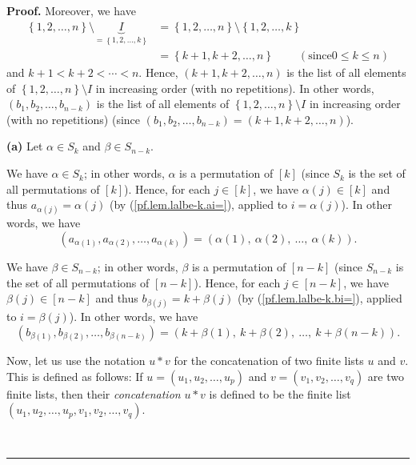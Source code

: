 \documentclass[numbers=enddot,12pt,final,onecolumn,notitlepage,english]{scrartcl}%
\theoremstyle{definition}
\newenvironment{proof}[1][Proof]{\noindent\textbf{#1.} }{\ \rule{0.5em}{0.5em}}
\newenvironment{verlong}{}{}
\begin{document}
\begin{verlong}
\begin{proof}
Moreover, we have%
\begin{align*}
\left\{  1,2,\ldots,n\right\}  \setminus\underbrace{I}_{=\left\{
1,2,\ldots,k\right\}  }  &  =\left\{  1,2,\ldots,n\right\}  \setminus\left\{
1,2,\ldots,k\right\} \\
&  =\left\{  k+1,k+2,\ldots,n\right\}  \ \ \ \ \ \ \ \ \ \ \left(  \text{since
}0\leq k\leq n\right)
\end{align*}
and $k+1<k+2<\cdots<n$. Hence, $\left(  k+1,k+2,\ldots,n\right)  $ is the list
of all elements of $\left\{  1,2,\ldots,n\right\}  \setminus I$ in increasing
order (with no repetitions). In other words, $\left(  b_{1},b_{2}%
,\ldots,b_{n-k}\right)  $ is the list of all elements of $\left\{
1,2,\ldots,n\right\}  \setminus I$ in increasing order (with no repetitions)
(since $\left(  b_{1},b_{2},\ldots,b_{n-k}\right)  =\left(  k+1,k+2,\ldots
,n\right)  $). \medskip

\textbf{(a)} Let $\alpha\in S_{k}$ and $\beta\in S_{n-k}$.

We have $\alpha\in S_{k}$; in other words, $\alpha$ is a permutation of
$\left[  k\right]  $ (since $S_{k}$ is the set of all permutations of $\left[
k\right]  $). Hence, for each $j\in\left[  k\right]  $, we have $\alpha\left(
j\right)  \in\left[  k\right]  $ and thus $a_{\alpha\left(  j\right)  }%
=\alpha\left(  j\right)  $ (by (\ref{pf.lem.lalbe-k.ai=}), applied to
$i=\alpha\left(  j\right)  $). In other words, we have%
\[
\left(  a_{\alpha\left(  1\right)  },a_{\alpha\left(  2\right)  }%
,\ldots,a_{\alpha\left(  k\right)  }\right)  =\left(  \alpha\left(  1\right)
,\ \alpha\left(  2\right)  ,\ \ldots,\ \alpha\left(  k\right)  \right)  .
\]


We have $\beta\in S_{n-k}$; in other words, $\beta$ is a permutation of
$\left[  n-k\right]  $ (since $S_{n-k}$ is the set of all permutations of
$\left[  n-k\right]  $). Hence, for each $j\in\left[  n-k\right]  $, we have
$\beta\left(  j\right)  \in\left[  n-k\right]  $ and thus $b_{\beta\left(
j\right)  }=k+\beta\left(  j\right)  $ (by (\ref{pf.lem.lalbe-k.bi=}), applied
to $i=\beta\left(  j\right)  $). In other words, we have%
\[
\left(  b_{\beta\left(  1\right)  },b_{\beta\left(  2\right)  },\ldots
,b_{\beta\left(  n-k\right)  }\right)  =\left(  k+\beta\left(  1\right)
,\ k+\beta\left(  2\right)  ,\ \ldots,\ k+\beta\left(  n-k\right)  \right)  .
\]


Now, let us use the notation $u\ast v$ for the concatenation of two finite
lists $u$ and $v$. This is defined as follows: If $u=\left(  u_{1}%
,u_{2},\ldots,u_{p}\right)  $ and $v=\left(  v_{1},v_{2},\ldots,v_{q}\right)
$ are two finite lists, then their \emph{concatenation} $u\ast v$ is defined
to be the finite list $\left(  u_{1},u_{2},\ldots,u_{p},v_{1},v_{2}%
,\ldots,v_{q}\right)  $.


\end{proof}
\end{verlong}
\end{document}
